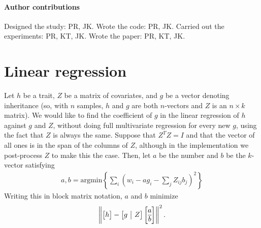 \documentclass{article}
\begin{document}
\paragraph{Author contributions}
Designed the study: PR, JK. Wrote the code: PR, JK. Carried out the experiments: PR, KT, JK. Wrote the paper: PR, KT, JK.



\clearpage
\appendix
\setcounter{table}{0}
\renewcommand{\thetable}{S\arabic{table}}
\setcounter{figure}{0}
\renewcommand{\thefigure}{S\arabic{figure}}




\appendix

\section{Linear regression}
\label{apx:regression}

Let $h$ be a trait, $Z$ be a matrix of covariates, and $g$ be a vector denoting inheritance
(so, with $n$ samples, $h$ and $g$ are both $n$-vectors and $Z$ is an $n \times k$ matrix).
We would like to find the coefficient of $g$ in the linear regression of $h$ against $g$ and $Z$,
without doing full multivariate regression for every new $g$,
using the fact that $Z$ is always the same.
Suppose that $Z^T Z = I$ and that the vector of all ones is in the span of the columns of $Z$,
although in the implementation we post-process $Z$ to make this the case.
Then, let $a$ be the number and $b$ be the $k$-vector satisfying
\begin{align*}
    a, b = \text{argmin}\left\{ \sum_i \left( w_i - a g_i - \sum_j Z_{ij} b_j \right)^2 \right\}
\end{align*}
Writing this in block matrix notation, $a$ and $b$ minimize
\begin{align*}
    \left\|
        \left[ \begin{array}{@{}c@{}} h \end{array}\right]
            -
        \left[ \begin{array}{@{}c|c@{}} g & Z \end{array} \right]
            \left[ \begin{array}{@{}c@{}} a \\ \hline b \end{array} \right]
    \right\|^2 .
\end{align*}
\end{document}
